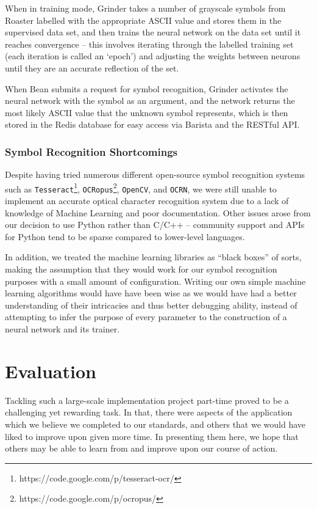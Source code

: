 \documentclass{acm_proc_article-sp}
\begin{document}
When in training mode, Grinder takes a number of grayscale symbols from Roaster labelled with the appropriate ASCII value and stores them in the supervised data set, and then trains the neural network on the data set until it reaches convergence -- this involves iterating through the labelled training set (each iteration is called an `epoch') and adjusting the weights between neurons until they are an accurate reflection of the set. 

When Bean submits a request for symbol recognition, Grinder activates the neural network with the symbol as an argument, and the network returns the most likely ASCII value that the unknown symbol represents, which is then stored in the Redis database for easy access via Barista and the RESTful API.

\subsubsection{Symbol Recognition Shortcomings}
Despite having tried numerous different open-source symbol recognition systems such as \texttt{Tesseract}\footnote{https://code.google.com/p/tesseract-ocr/}, \texttt{OCRopus}\footnote{https://code.google.com/p/ocropus/}, \texttt{OpenCV}, and \texttt{OCRN}, we were still unable to implement an accurate optical character recognition system due to a lack of knowledge of Machine Learning and poor documentation. Other issues arose from our decision to use Python rather than C/C++ -- community support and APIs for Python tend to be sparse compared to lower-level languages.

In addition, we treated the machine learning libraries as ``black boxes'' of sorts, making the assumption that they would work for our symbol recognition purposes with a small amount of configuration. Writing our own simple machine learning algorithms would have have been wise as we would have had a better understanding of their intricacies and thus better debugging ability, instead of attempting to infer the purpose of every parameter to the construction of a neural network and its trainer.

\section{Evaluation}
Tackling such a large-scale implementation project part-time proved to be a challenging yet rewarding task. In that, there were aspects of the application which we believe we completed to our standards, and others that we would have liked to improve upon given more time. In presenting them here, we hope that others may be able to learn from and improve upon our course of action.
\end{document}
